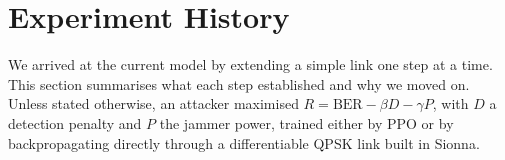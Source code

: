 %
%

\section{Experiment History}
\label{sec:exphist}
We arrived at the current model by extending a simple link one step at a time.
This section summarises what each step established and why we moved on.
Unless stated otherwise, an attacker maximised $R = \mathrm{BER} - \beta D - \gamma P$, with $D$ a
detection penalty and $P$ the jammer power, trained either by PPO or by backpropagating directly
through a differentiable QPSK link built in Sionna.

